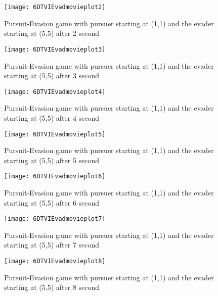 \begin{figure}
\vspace{2.4in}
\centering
\texttt{[image: 6DTVIEvadmovieplot2]}
\caption{Pursuit-Evasion game with pursuer starting at (1,1) and the evader starting at (5,5) after 2 second}
\label{6DTVIEvadmovieplot2}
\end{figure}
\clearpage
\newpage

\begin{figure}
\vspace{2.4in}
\centering
\texttt{[image: 6DTVIEvadmovieplot3]}
\caption{Pursuit-Evasion game with pursuer starting at (1,1) and the evader starting at (5,5) after 3 second}
\label{6DTVIEvadmovieplot3}
\end{figure}
\clearpage
\newpage

\begin{figure}
\vspace{2.4in}
\centering
\texttt{[image: 6DTVIEvadmovieplot4]}
\caption{Pursuit-Evasion game with pursuer starting at (1,1) and the evader starting at (5,5) after 4 second}
\label{6DTVIEvadmovieplot4}
\end{figure}
\clearpage
\newpage

\begin{figure}
\vspace{2.4in}
\centering
\texttt{[image: 6DTVIEvadmovieplot5]}
\caption{Pursuit-Evasion game with pursuer starting at (1,1) and the evader starting at (5,5) after 5 second}
\label{6DTVIEvadmovieplot5}
\end{figure}
\clearpage
\newpage

\begin{figure}
\vspace{2.4in}
\centering
\texttt{[image: 6DTVIEvadmovieplot6]}
\caption{Pursuit-Evasion game with pursuer starting at (1,1) and the evader starting at (5,5) after 6 second}
\label{6DTVIEvadmovieplot6}
\end{figure}
\clearpage
\newpage

\begin{figure}
\vspace{2.4in}
\centering
\texttt{[image: 6DTVIEvadmovieplot7]}
\caption{Pursuit-Evasion game with pursuer starting at (1,1) and the evader starting at (5,5) after 7 second}
\label{6DTVIEvadmovieplot7}
\end{figure}
\clearpage
\newpage

\begin{figure}
\vspace{2.4in}
\centering
\texttt{[image: 6DTVIEvadmovieplot8]}
\caption{Pursuit-Evasion game with pursuer starting at (1,1) and the evader starting at (5,5) after 8 second}
\label{6DTVIEvadmovieplot8}
\end{figure}
\clearpage
\newpage

